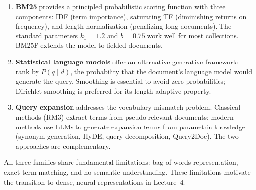 \documentclass[11pt,a4paper]{article}
\theoremstyle{definition}
\theoremstyle{plain}
\begin{document}
\begin{enumerate}
    \item \textbf{BM25} provides a principled probabilistic scoring function with three components: IDF (term importance), saturating TF (diminishing returns on frequency), and length normalization (penalizing long documents). The standard parameters $k_1 = 1.2$ and $b = 0.75$ work well for most collections. BM25F extends the model to fielded documents.
    
    \item \textbf{Statistical language models} offer an alternative generative framework: rank by $P(q \mid d)$, the probability that the document's language model would generate the query. Smoothing is essential to avoid zero probabilities; Dirichlet smoothing is preferred for its length-adaptive property.
    
    \item \textbf{Query expansion} addresses the vocabulary mismatch problem. Classical methods (RM3) extract terms from pseudo-relevant documents; modern methods use LLMs to generate expansion terms from parametric knowledge (synonym generation, HyDE, query decomposition, Query2Doc). The two approaches are complementary.
\end{enumerate}

All three families share fundamental limitations: bag-of-words representation, exact term matching, and no semantic understanding. These limitations motivate the transition to dense, neural representations in Lecture~4.
\end{document}
